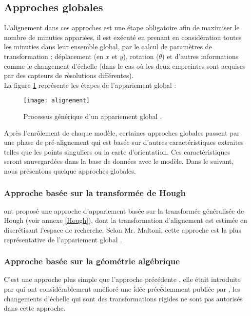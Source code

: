 \subsection{Approches globales }
L'alignement dans ces approches est une étape obligatoire afin de maximiser le nombre de minuties appariées, il est exécuté en prenant en considération toutes les minuties dans leur ensemble global, par le calcul de paramètres de transformation : déplacement (en $ x $ et $ y $), rotation ($ \theta $) et d'autres informations comme le changement d'échelle (dans le cas où les deux empreintes sont acquises par des capteurs de résolutions différentes). \\
La figure \ref{fig:alignement} représente les étapes de l'appariement global : 
\begin{center}
	\begin{figure}[H]
		\centering
		\texttt{[image: alignement]}
		\caption{Processus générique d'un appariement global \citep{Jianjiang2010Finger}.}
		\label{fig:alignement}
	\end{figure}
\end{center}

Après l'enrôlement de chaque modèle, certaines approches globales passent par une phase de pré-alignement qui est basée sur d'autres caractéristiques extraites telles que les points singuliers ou la carte d'orientation. Ces caractéristiques seront sauvegardées dans la base de données avec le modèle. Dans le suivant, nous présentons quelque approches globales. 
\subsubsection{Approche basée sur la transformée de Hough}
\label{chp2hough}
\citep{ratha1996real} ont proposé une approche d'appariement basée sur la transformée généralisée de Hough (voir annexe \ref{Hough}), dont la transformation d'alignement est estimée en discrétisant l'espace de recherche. Selon Mr. Maltoni, cette approche est la plus représentative de l'appariement global \citep{maltoni2009handbook}.

\subsubsection{Approche basée sur la géométrie algébrique}
C'est une approche plus simple que l'approche précédente \citep{maltoni2009handbook}, elle était introduite par \citep{udupa2001fast} qui ont considérablement amélioré une idée précédemment publiée par \citep{weber1992cost}, les changements d'échelle qui sont des transformations rigides ne sont pas autorisés dans cette approche. 
